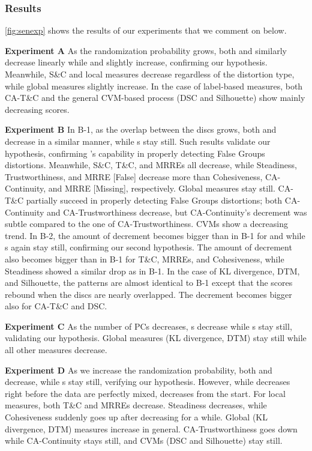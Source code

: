 \subsubsection{Results}

\autoref{fig:senexp} shows the results of our experiments that we comment on below. %

\noindent
\textbf{Experiment A} As the randomization probability grows, both \lt [DSC] and \lt [\CHb{}] similarly decrease linearly while \lc [DSC] and \lc [\CHb{}] slightly increase, confirming our hypothesis. 
Meanwhile, S\&C and local measures decrease regardless of the distortion type, while global measures slightly increase.
In the case of label-based measures, both CA-T\&C and the general CVM-based process (DSC and Silhouette) show mainly decreasing scores.

\noindent
\textbf{Experiment B} In B-1, as the overlap between the discs grows, both \lt [DSC] and \lt [\CHb{}] decrease in a similar manner, while \lc{}s stay still. 
Such results validate our hypothesis, confirming \ltc's capability in properly detecting False Groups distortions. 
Meanwhile, S\&C,  T\&C, and MRREs all decrease, while Steadiness, Trustworthiness, and MRRE [False] decrease more than Cohesiveness, CA-Continuity, and MRRE [Missing], respectively. 
Global measures stay still.
CA-T\&C partially succeed in properly detecting False Groups distortions; both CA-Continuity and CA-Trustworthiness decrease, but CA-Continuity's decrement was subtle compared to the one of CA-Trustworthiness. 
CVMs show a decreasing trend.
In B-2, the amount of decrement becomes bigger than in B-1 for \lt [DSC] and \lt [\CHb{}] while \lc{}s again stay still, confirming our second hypothesis.
The amount of decrement also becomes bigger than in B-1 for  T\&C, MRREs, and Cohesiveness, while Steadiness showed a similar drop as in B-1. 
In the case of KL divergence, DTM, and Silhouette, the patterns are almost identical to B-1 except that the scores rebound when the discs are nearly overlapped. 
The decrement becomes bigger also for CA-T\&C and DSC.


\noindent
\textbf{Experiment C} As the number of PCs decreases, \lt{}s decrease while \lc{}s stay still, validating our hypothesis. 
Global measures (KL divergence, DTM) stay still while all other measures decrease.

\noindent
\textbf{Experiment D} As we increase the randomization probability, both \lc [DSC] and \lc [\CHb{}] decrease, while \lt{}s stay still, verifying our hypothesis. However, while \lc [DSC] decreases right before the data are perfectly mixed, \lc [\CHb{}] decreases from the start. 
For local measures, both T\&C and MRREs decrease. 
Steadiness decreases, while Cohesiveness suddenly goes up after decreasing for a while.
Global (KL divergence, DTM) measures increase in general.
CA-Trustworthiness goes down while CA-Continuity stays still, and CVMs (DSC and Silhouette) stay still. 

